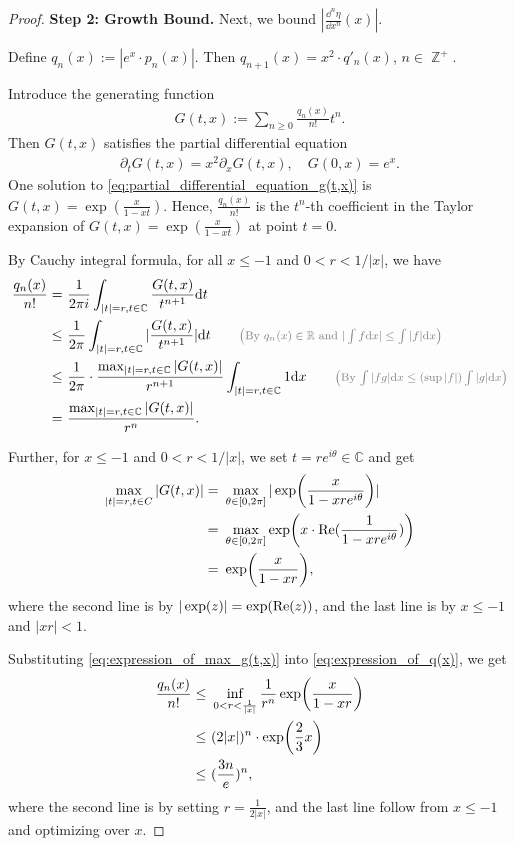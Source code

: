 \documentclass[12pt]{article}
\numberwithin{equation}{section}
\DeclareMathOperator*{\Z}{\mathbb{Z}}
\def\R{\mathbb{R}}
\theoremstyle{theoremstyle}
\numberwithin{equation}{section}
\numberwithin{theorem}{section}
\numberwithin{proposition}{section}
\numberwithin{definition}{section}
\numberwithin{lemma}{section}
\numberwithin{assumption}{section}
\numberwithin{remark}{section}
\newcommand*{\annot}[1]{\tag*{\footnotesize{\textcolor{black!50}{\big(#1\big)}}}}
\begin{document}
\begin{proof}
\textbf{Step 2: Growth Bound.}
Next, we bound $|\frac{\dd^n\eta}{\dd x^n}(x)|$.

Define $q_n(x) := |e^x \cdot p_n(x)|$. 
Then $q_{n+1}(x)=x^2\cdot q'_n(x)$, $n\in\Z^+$.

Introduce the generating function 
\begin{align*}
    G(t,x):=\sum_{n\geq0}\frac{q_n(x)}{n!}t^n.
\end{align*}
Then $G(t,x)$ satisfies the partial differential equation
\begin{align}
\label{eq:partial_differential_equation_g(t,x)}
    \partial_tG(t,x) = x^2\partial_xG(t,x),\quad
    G(0,x) = e^x.
\end{align}
One solution to \eqref{eq:partial_differential_equation_g(t,x)} is $G(t,x)=\exp(\frac{x}{1-xt})$.
Hence, $\frac{q_n(x)}{n!}$ is the $t^n$-th coefficient in the Taylor expansion of $G(t,x)=\exp(\frac{x}{1-xt})$ at point $t=0$.


By Cauchy integral formula, for all 
$x\leq-1$ and $0<r<1/|x|$, we have
\begin{align}
    \frac{q_n(x)}{n!}= & ~
    \frac{1}{2\pi i}\int_{|t|=r,t\in \mathbb{C}} \frac{G(t,x)}{t^{n+1}} \dd t \notag\\
    \leq & ~
    \frac{1}{2\pi}\int_{|t|=r,t\in \mathbb{C}} |\frac{G(t,x)}{t^{n+1}}| \dd t \annot{By $q_n(x)\in\R$ and $|\int f \dd x|\leq \int |f| \dd x$}\\
    \leq & ~ 
    \frac{1}{2\pi } \cdot \frac{\max_{|t|=r,t\in \mathbb{C}}|G(t,x)|}{r^{n+1}} \int_{|t|=r,t\in \mathbb{C}} 1 \dd x \annot{By $\int |fg| \dd x \leq (\sup|f|)\int |g| \dd x$}\\
    \label{eq:expression_of_q(x)}
    = & ~
    \frac{\max_{|t|=r,t\in \mathbb{C}}|G(t,x)|}{r^n}.
\end{align}

Further, for $x\leq-1$ and $0<r<1/|x|$, we set $t=re^{i\theta}\in \mathbb{C}$ and get
\begin{align}
    \max_{|t|=r,t\in C}|G(t,x)| = & ~
    \max_{\theta\in[0,2\pi]}|\exp(\frac{x}{1-xre^{i\theta}})| \notag\\
    = & ~
    \max_{\theta\in[0,2\pi]}\exp(x\cdot{\rm Re}(\frac{1}{1-xre^{i\theta}})) \notag\\
    \label{eq:expression_of_max_g(t,x)}
    = & ~
    \exp(\frac{x}{1-xr}), 
\end{align}
where the second line is by $|\exp(z)|=\exp({\rm Re}(z))$, and the last line is by $x\leq-1$ and $|xr|<1$.


Substituting \eqref{eq:expression_of_max_g(t,x)} into \eqref{eq:expression_of_q(x)}, we get
\begin{align}
    \frac{q_n(x)}{n!} 
    \leq & ~
    \inf_{0<r<\frac{1}{|x|}}\frac{1}{r^n}\exp(\frac{x}{1-xr}) \notag\\
    \leq & ~
    (2|x|)^n\cdot\exp(\frac{2}{3}x) \notag \\
    \label{eq:bound_on_q(x)_final}
    \leq & ~
    (\frac{3n}{e})^n,
\end{align}
where the second line is by setting $r=\frac{1}{2|x|}$, and the last line follow from $x\leq-1$ and optimizing over $x$.


\end{proof}
\end{document}
